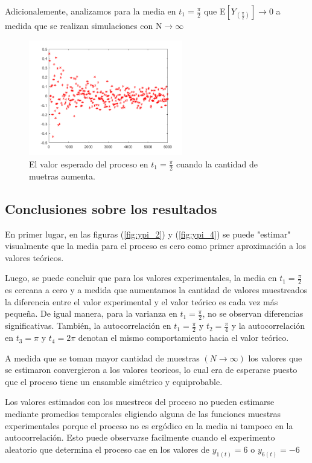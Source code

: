 Adicionalemente, analizamos para la media en $t_1 = \frac{\pi}{2}$ que E$\left[ Y_{(\frac{\pi}{2})}\right]\rightarrow 0$ a medida que se realizan simulaciones con N$\rightarrow \infty$
\begin{figure}[H]
\centering
	\includegraphics[width=0.6\textwidth, trim = {0 0 0 0},clip]{./ImagenesEjercicio1/media.png}
	\caption{El valor esperado del proceso en $t_1 = \frac{\pi}{2}$ cuando la cantidad de muetras aumenta.}
	\label{fig:media}
\end{figure}

\subsection{Conclusiones sobre los resultados}

En primer lugar, en las figuras (\ref{fig:ypi_2}) y (\ref{fig:ypi_4}) se puede "estimar" visualmente que la media para el proceso es cero como primer aproximación a los valores teóricos.

Luego, se puede concluir que para los valores experimentales, la media en $t_1 = \frac{\pi}{2}$ es cercana a cero y a medida que aumentamos la cantidad de valores muestreados la diferencia entre el valor experimental y el valor teórico es cada vez más pequeña. De igual manera, para la varianza en $t_1 = \frac{\pi}{2}$, no se observan diferencias significativas.
También, la autocorrelación en $t_1 = \frac{\pi}{2}$ y $t_2 = \frac{\pi}{4}$ y la autocorrelación en $t_3 = \pi$ y $t_4 = 2\pi$ denotan el mismo comportamiento hacia el valor teórico. 

A medida que se toman mayor cantidad de muestras $(N \rightarrow \infty )$ los valores que se estimaron convergieron a los valores teoricos, lo cual era de esperarse puesto que el proceso tiene un ensamble simétrico y equiprobable. 

Los valores estimados con los muestreos del proceso no pueden estimarse mediante promedios temporales eligiendo alguna de las funciones muestras experimentales porque el proceso no es ergódico en la media ni tampoco en la autocorrelación. Esto puede observarse facilmente cuando el experimento aleatorio que determina el proceso cae en los valores de $y_{1(t)} = 6$ o $y_{6(t)} = -6$ 

%

